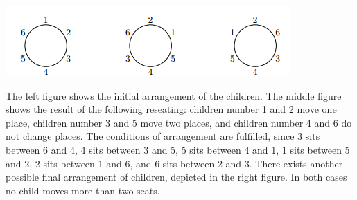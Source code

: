 \includegraphics{birthday.png}

The left figure shows the initial arrangement of the children. The middle figure shows the result of the
following reseating: children number 1 and 2 move one place, children number 3 and 5 move two places,
and children number 4 and 6 do not change places. The conditions of arrangement are fulfilled, since 3 sits
between 6 and 4, 4 sits between 3 and 5, 5 sits between 4 and 1, 1 sits between 5 and 2, 2 sits between 1 and
6, and 6 sits between 2 and 3. There exists another possible final arrangement of children, depicted in the
right figure. In both cases no child moves more than two seats.
